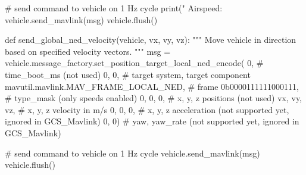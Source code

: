 \begin{apendicesenv}
\begin{python_}
	# send command to vehicle on 1 Hz cycle
	print(" Airspeed: %
	vehicle.send_mavlink(msg)
	vehicle.flush()


def send_global_ned_velocity(vehicle, vx, vy, vz):
	"""
	Move vehicle in direction based on specified velocity vectors.
	"""
	msg = vehicle.message_factory.set_position_target_local_ned_encode(
		0,       # time_boot_ms (not used)
		0, 0,    # target system, target component
		mavutil.mavlink.MAV_FRAME_LOCAL_NED, # frame
		0b0000111111000111, # type_mask (only speeds enabled)
		0, 0, 0, # x, y, z positions (not used)
		vx, vy, vz, # x, y, z velocity in m/s
		0, 0, 0, # x, y, z acceleration (not supported yet, ignored in GCS_Mavlink)
		0, 0)    # yaw, yaw_rate (not supported yet, ignored in GCS_Mavlink)
	
	# send command to vehicle on 1 Hz cycle
	vehicle.send_mavlink(msg)
	vehicle.flush()
\end{python_}

\end{apendicesenv}
